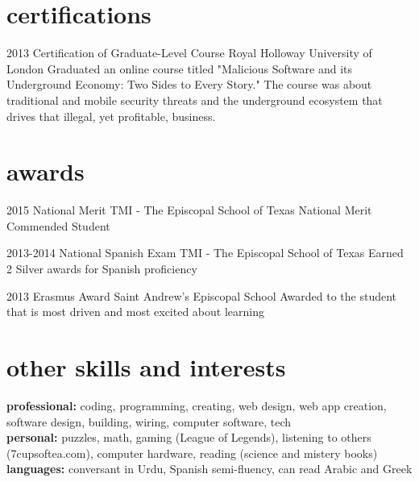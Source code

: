 \documentclass[]{friggeri-cv} %
\begin{document}
\section{certifications}

\begin{entrylist}


\entry
{2013}
{Certification of Graduate-Level Course}
{Royal Holloway University of London}
{Graduated an online course titled "Malicious Software and its Underground Economy: Two Sides to Every Story." The course was about traditional and mobile security threats and the underground ecosystem that drives that illegal, yet profitable, business.}


\end{entrylist} 

\section{awards}

\begin{entrylist}


\entry
{2015}
{National Merit}
{TMI - The Episcopal School of Texas}
{National Merit Commended Student}


\entry
{2013-2014}
{National Spanish Exam}
{TMI - The Episcopal School of Texas}
{Earned 2 Silver awards for Spanish proficiency}


\entry
{2013}
{Erasmus Award}
{Saint Andrew's Episcopal School}
{Awarded to the student that is most driven and most excited about learning}


\end{entrylist}


\section{other skills and interests}

\textbf{professional:} coding, programming, creating, web design, web app creation, software design, building, wiring, computer software, tech 
\\ 
\textbf{personal:} puzzles, math, gaming (League of Legends), listening to others (7cupsoftea.com), computer hardware, reading (science and mistery books)   \\ 
\textbf{languages:} conversant in Urdu, Spanish semi-fluency, can read Arabic and Greek
\end{document}
